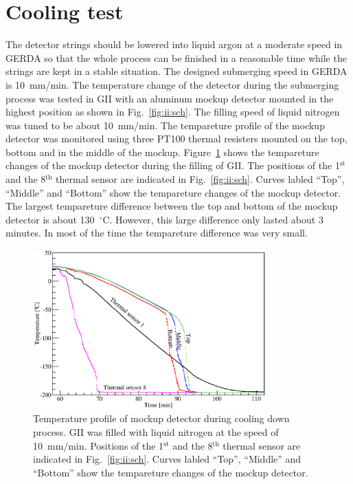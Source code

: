 \section{Cooling test}
\label{sec:ii:cool}
The detector strings should be lowered into liquid argon at a moderate speed in GERDA so that the whole process can be finished in a reasonable time while the strings are kept in a stable situation. The designed submerging speed in GERDA is 10~mm/min. The temperature change of the detector during the submerging process was tested in GII with an aluminum mockup detector mounted in the highest position as shown in Fig.~\ref{fig:ii:sch}. The filling speed of liquid nitrogen was tuned to be about 10~mm/min. The tempareture profile of the mockup detector was monitored using three PT100 thermal resisters mounted on the top, bottom and in the middle of the mockup. Figure~\ref{fig:ii:temp} shows the tempareture changes of the mockup detector during the filling of GII. The positions of the 1$^{\text{st}}$ and the 8$^{\text{th}}$ thermal sensor are indicated in Fig.~\ref{fig:ii:sch}. Curves labled ``Top'', ``Middle'' and ``Bottom'' show the tempareture changes of the mockup detector. The largest tempareture difference between the top and bottom of the mockup detector is about 130~$^{\circ}$C. However, this large difference only lasted about 3 minutes. In most of the time the tempareture difference was very small.
\begin{figure}[htbp]
\centering
\includegraphics[width=0.8\textwidth]{temp}
\caption{Temperature profile of mockup detector during cooling down process. GII was filled with liquid nitrogen at the speed of 10~mm/min. Positions of the 1$^{\text{st}}$ and the 8$^{\text{th}}$ thermal sensor are indicated in Fig.~\ref{fig:ii:sch}. Curves labled ``Top'', ``Middle'' and ``Bottom'' show the tempareture changes of the mockup detector.}
\label{fig:ii:temp}
\end{figure}


